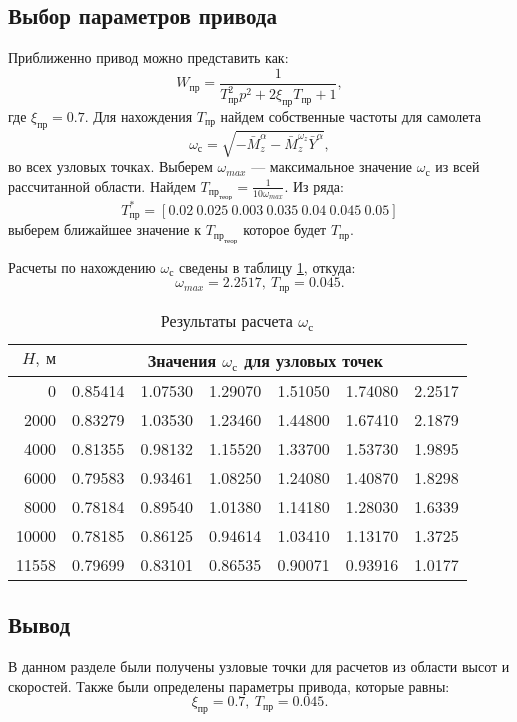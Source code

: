 \subsection{Выбор параметров привода}
Приближенно привод можно представить как:
\[
    W_\text{пр} = \frac{1}{ T_\text{пр}^2 p^2 + 2 \xi_{\text{пр}}T_\text{пр}+ 1}, 
\]
где $\xi_{\text{пр}}=0.7$. Для нахождения $T_{\text{пр}}$ найдем собственные частоты для самолета
\[
\omega_\text{с} = \sqrt{-\bar{M}_z^\alpha - \bar{M}_z^{ \omega_z} \bar{Y}^\alpha},
\]
во всех узловых точках. Выберем $\omega_{max}$ --- максимальное значение
$\omega_{\text{с}}$ из всей рассчитанной области. Найдем $T_{{\text{пр}}_{\text{теор}}} =
\frac{1}{10\omega_{max}}$.
Из ряда: 
\[
  T_{\text{пр}}^* = [0.02 \ 0.025 \ 0.003 \ 0.035 \ 0.04 \ 0.045 \ 0.05]  
\]
выберем ближайшее значение к $T_{{\text{пр}}_{\text{теор}}}$ которое будет $T_{\text{пр}}$.

Расчеты по нахождению $\omega_с$ сведены в таблицу \ref{tab:driver_tab}, откуда:
\[
    \omega_{max} = 2.2517,\ T_{\text{пр}} = 0.045.
\]

\begin{table}[H]
    \centering
    \caption{Результаты расчета $\omega_{\text{с}}$}
    \label{tab:driver_tab}
    \begin{tabular}{|r|rrrrrr|}
    \hline
    $H,\ м$ & \multicolumn{6}{c|}{Значения $\omega_с$ для узловых точек}\\
    \hline
0 & 0.85414 & 1.07530 & 1.29070 & 1.51050 & 1.74080 & 2.2517\cellcolor{green} \\
2000 & 0.83279 & 1.03530 & 1.23460 & 1.44800 & 1.67410 &                  2.1879 \\
4000 & 0.81355 & 0.98132 & 1.15520 & 1.33700 & 1.53730 &                  1.9895 \\
6000 & 0.79583 & 0.93461 & 1.08250 & 1.24080 & 1.40870 &                  1.8298 \\
8000 & 0.78184 & 0.89540 & 1.01380 & 1.14180 & 1.28030 &                  1.6339 \\
10000 & 0.78185 & 0.86125 & 0.94614 & 1.03410 & 1.13170 &                  1.3725 \\
11558 & 0.79699 & 0.83101 & 0.86535 & 0.90071 & 0.93916 &                  1.0177 \\
    \hline
    \end{tabular}
\end{table}

\subsection{Вывод}
В данном разделе были получены узловые точки для расчетов из области высот и скоростей. Также были определены параметры привода, которые равны:
\[
    \xi_{пр} = 0.7,\ T_{пр} = 0.045.
\]


